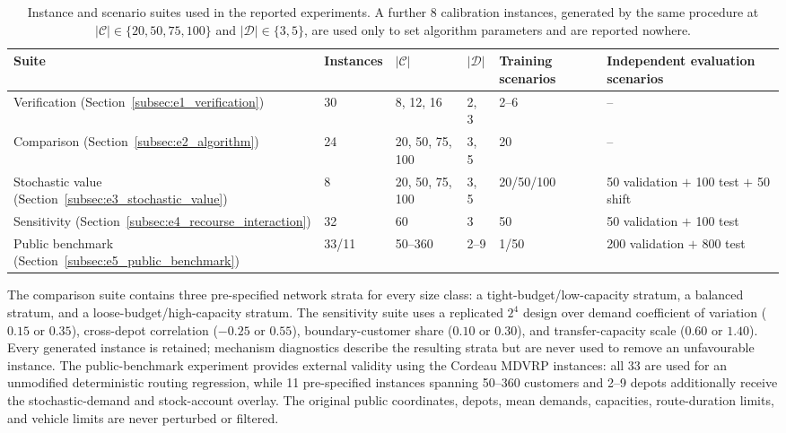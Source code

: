 \documentclass[authoryear,final,3p,times]{elsarticle}
\theoremstyle{definition}
\theoremstyle{plain}
\begin{document}
\begin{table}[!htbp]
\centering
\caption{Instance and scenario suites used in the reported experiments. A further 8 calibration instances, generated by the same procedure at $|\mathcal C|\in\{20,50,75,100\}$ and $|\mathcal D|\in\{3,5\}$, are used only to set algorithm parameters and are reported nowhere.}
\label{tab:frozen_data_suites}
\footnotesize
\renewcommand{\arraystretch}{1.12}
\begin{tabular}{@{}llllll@{}}
\toprule
Suite & Instances & $|\mathcal C|$ & $|\mathcal D|$ & Training scenarios & Independent evaluation scenarios \\
\midrule
Verification (Section~\ref{subsec:e1_verification})    & 30 & 8, 12, 16 & 2, 3 & 2--6 & -- \\
Comparison (Section~\ref{subsec:e2_algorithm})         & 24 & 20, 50, 75, 100 & 3, 5 & 20 & -- \\
Stochastic value (Section~\ref{subsec:e3_stochastic_value}) & 8 & 20, 50, 75, 100 & 3, 5 & 20/50/100 & 50 validation $+$ 100 test $+$ 50 shift \\
Sensitivity (Section~\ref{subsec:e4_recourse_interaction})  & 32 & 60 & 3 & 50 & 50 validation $+$ 100 test \\
Public benchmark (Section~\ref{subsec:e5_public_benchmark}) & 33/11 & 50--360 & 2--9 & 1/50 & 200 validation $+$ 800 test \\
\bottomrule
\end{tabular}
\end{table}

The comparison suite contains three pre-specified network strata for every size class: a tight-budget/low-capacity stratum, a balanced stratum, and a loose-budget/high-capacity stratum.  The sensitivity suite uses a replicated $2^4$ design over demand coefficient of variation ($0.15$ or $0.35$), cross-depot correlation ($-0.25$ or $0.55$), boundary-customer share ($0.10$ or $0.30$), and transfer-capacity scale ($0.60$ or $1.40$).  Every generated instance is retained; mechanism diagnostics describe the resulting strata but are never used to remove an unfavourable instance.  The public-benchmark experiment provides external validity using the Cordeau MDVRP instances: all 33 are used for an unmodified deterministic routing regression, while 11 pre-specified instances spanning 50--360 customers and 2--9 depots additionally receive the stochastic-demand and stock-account overlay.  The original public coordinates, depots, mean demands, capacities, route-duration limits, and vehicle limits are never perturbed or filtered.
\end{document}
